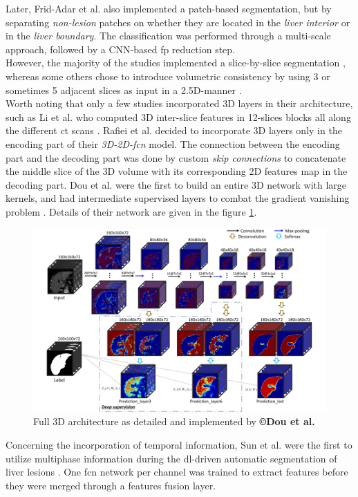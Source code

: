 Later, Frid-Adar et al. \cite{Frid-adar2017} also implemented a patch-based
segmentation, but by separating \emph{non-lesion} patches on whether
they are located in the \emph{liver interior} or in the \emph{liver
	boundary}. The classification was performed through a multi-scale
approach, followed by a CNN-based \ac{fp} reduction step.\\
However, the majority of the studies implemented a slice-by-slice
segmentation \cite{Chlebus2018, Kaluva2018, Bi2017}, whereas some others chose to introduce volumetric
consistency by using 3 or sometimes 5 adjacent slices as input in a
2.5D-manner \cite{Han2017, Yuan2017, Bellver2017}.\\
Worth noting that only a few studies incorporated 3D layers in
their architecture, such as Li et al. who computed 3D
inter-slice features in 12-slices blocks all along the different \ac{ct}
scans \cite{Li2018}. Rafiei et al. \cite{Rafiei2018} decided to incorporate 3D layers only in
the encoding part of their \emph{3D-2D-\ac{fcn}} model. The connection
between the encoding part and the decoding part was done by custom
\emph{skip connections} to concatenate the middle slice of the 3D volume
with its corresponding 2D features map in the decoding part. Dou
et al. were the first to build an entire 3D network with large kernels,
and had intermediate supervised layers to combat the gradient vanishing
problem \cite{Dou2016}. Details of their network are given in the figure \ref{Dou2016_3Darchitecture}.

\begin{figure}[th!]
	\centering
	\includegraphics[width=0.7\linewidth]{images/image30}
	\caption{Full 3D architecture as detailed and implemented by \textbf{©Dou et al. \cite{Dou2016}}}
	\label{Dou2016_3Darchitecture}
\end{figure}

Concerning the incorporation of temporal information, Sun et
al. were the first to utilize multiphase information during the
\ac{dl}-driven automatic segmentation of liver lesions \cite{Sun2017}. One \ac{fcn} network per
channel was trained to extract features before they were merged through
a features fusion layer.

